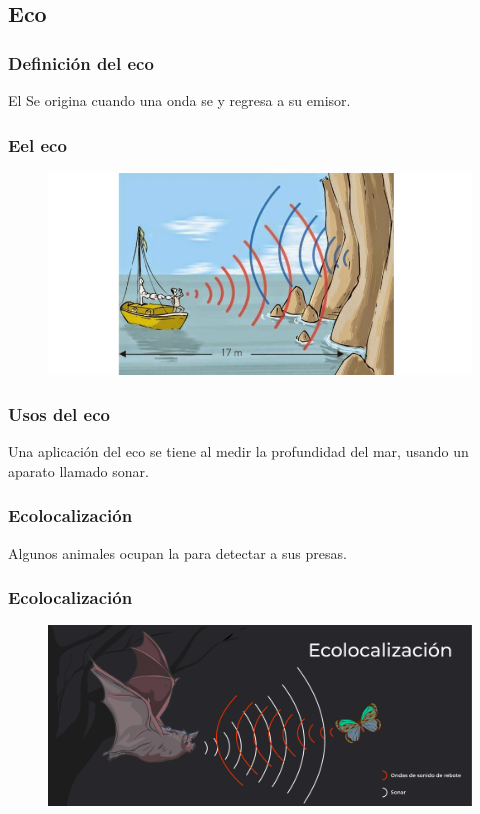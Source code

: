 \documentclass[14pt]{beamer}
\begin{document}
\subsection{Eco}

\begin{frame}
\frametitle{Definición del eco}
El Se origina cuando una onda se  y regresa a su emisor.
\end{frame}
\begin{frame}
\frametitle{Eel eco}
\begin{figure}
    \centering
    \includegraphics[width = \linewidth]{Imagenes/Eco_01.png}
\end{figure}
\end{frame}
\begin{frame}
\frametitle{Usos del eco}
Una aplicación del eco se tiene al medir la profundidad del mar, usando un aparato llamado sonar.
\end{frame}
\begin{frame}
\frametitle{Ecolocalización}
Algunos animales ocupan la  para detectar a sus presas.
\end{frame}
\begin{frame}
\frametitle{Ecolocalización}
\begin{figure}
    \centering
    \includegraphics[width = \linewidth]{Imagenes/Eco_02b.png}
\end{figure}
\end{frame}
\end{document}
